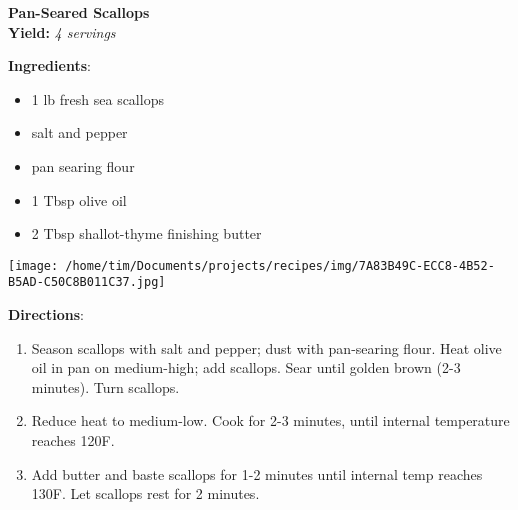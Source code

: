 \documentclass[11pt, twoside, openany]{book}
\begin{document}
\noindent\begin{minipage}[t]{\linewidth}%
{\Large\textbf{Pan-Seared Scallops}} \label{pan-seared-scallops}\hfill\textit{}\\
\textbf{Yield:} \textit{4 servings}\\
\noindent\begin{minipage}[t]{0.78\linewidth}%
\textbf{Ingredients}:\vspace{-3mm}
\begin{multicols}{2}
\begin{itemize}\setlength\itemsep{-1mm}
\item 1 lb fresh sea scallops
\item salt and pepper
\item pan searing flour
\item 1 Tbsp olive oil
\item 2 Tbsp shallot-thyme finishing butter
\end{itemize}
\end{multicols}
\end{minipage}
\noindent\begin{minipage}[t]{0.18\linewidth}
\centering \strut\vspace*{-\baselineskip}\newline
\texttt{[image: /home/tim/Documents/projects/recipes/img/7A83B49C-ECC8-4B52-B5AD-C50C8B011C37.jpg]}\\
\end{minipage}\vspace{3mm}
\textbf{Directions}:
\vspace{-3mm}\begin{enumerate}\setlength\itemsep{-1mm}
\item Season scallops with salt and pepper; dust with pan-searing flour. Heat olive oil in pan on medium-high; add scallops. Sear until golden brown (2-3 minutes). Turn scallops.
\item Reduce heat to medium-low. Cook for 2-3 minutes, until internal temperature reaches 120F.
\item Add butter and baste scallops for 1-2 minutes until internal temp reaches 130F. Let scallops rest for 2 minutes.
\end{enumerate}
\end{minipage}\vspace{8mm}
\end{document}
